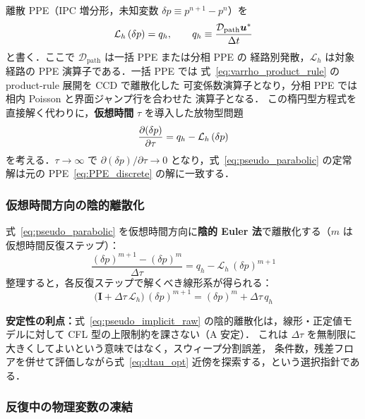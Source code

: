 離散 PPE（IPC 増分形，未知変数 $\delta p \equiv p^{n+1}-p^n$）を
\begin{equation}
  \mathcal{L}_h\,(\delta p) = q_h,
  \qquad
  q_h \equiv \frac{\mathcal{D}_{\mathrm{path}}\bm{u}^*}{\Delta t}
  \label{eq:PPE_discrete}
\end{equation}
と書く．ここで $\mathcal{D}_{\mathrm{path}}$ は一括 PPE または分相 PPE の
経路別発散，$\mathcal{L}_h$ は対象経路の PPE 演算子である．一括 PPE では
式~\eqref{eq:varrho_product_rule} の product-rule 展開を CCD で離散化した
可変係数演算子となり，分相 PPE では相内 Poisson と界面ジャンプ行を合わせた
演算子となる．
この楕円型方程式を直接解く代わりに，\textbf{仮想時間} $\tau$ を導入した放物型問題
\begin{equation}
  \dfrac{\partial (\delta p)}{\partial \tau} = q_h - \mathcal{L}_h\,(\delta p)
  \label{eq:pseudo_parabolic}
\end{equation}
を考える．$\tau\to\infty$ で $\partial(\delta p)/\partial\tau \to 0$ となり，式~\eqref{eq:pseudo_parabolic} の定常解は元の PPE~\eqref{eq:PPE_discrete} の解に一致する．

\subsubsection{仮想時間方向の陰的離散化}
\label{sec:pseudo_implicit}

式~\eqref{eq:pseudo_parabolic} を仮想時間方向に\textbf{陰的 Euler 法}で離散化する（$m$ は仮想時間反復ステップ）：
\begin{equation}
  \frac{(\delta p)^{m+1} - (\delta p)^m}{\Delta\tau} = q_h - \mathcal{L}_h\,(\delta p)^{m+1}
  \label{eq:pseudo_implicit_raw}
\end{equation}
整理すると，各反復ステップで解くべき線形系が得られる：
\begin{equation}
  \bigl(\mathbf{I} + \Delta\tau\,\mathcal{L}_h\bigr)\,(\delta p)^{m+1}
  = (\delta p)^m + \Delta\tau\, q_h
  \label{eq:pseudo_linear}
\end{equation}

\textbf{安定性の利点：}式~\eqref{eq:pseudo_implicit_raw} の陰的離散化は，線形・正定値モデルに対して
CFL 型の上限制約を課さない（A 安定）．
これは $\Delta\tau$ を無制限に大きくしてよいという意味ではなく，スウィープ分割誤差，
条件数，残差フロアを併せて評価しながら式~\eqref{eq:dtau_opt} 近傍を探索する，という選択指針である．

\subsubsection{反復中の物理変数の凍結}
\label{sec:pseudo_variable_freeze}

